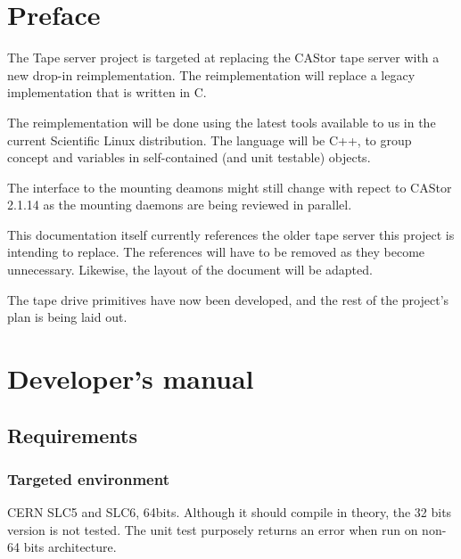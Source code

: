 \chapter*{Preface}

The Tape server project is targeted at replacing the CAStor tape server with a new drop-{}in reimplementation. The reimplementation will replace a legacy implementation that is written in C.

The reimplementation will be done using the latest tools available to us in the current Scientific Linux distribution. The language will be C++, to group concept and variables in self-contained
(and unit testable) objects.

The interface to the mounting deamons might still change with repect to CAStor 2.1.14 as the mounting daemons are being reviewed in parallel.

This documentation itself currently references the older tape server this project is intending to replace. The references will have to be removed as they become unnecessary. 
Likewise, the layout of the document will be adapted.

The tape drive primitives have now been developed, and the rest of the project's
plan is being laid out.


\chapter{Developer's manual}

\section{Requirements}

\subsection{Targeted environment}

CERN SLC5 and SLC6, 64bits. Although it should compile in theory, the 32 bits version is not tested. The unit test purposely returns an error when run on non-64 bits architecture.

